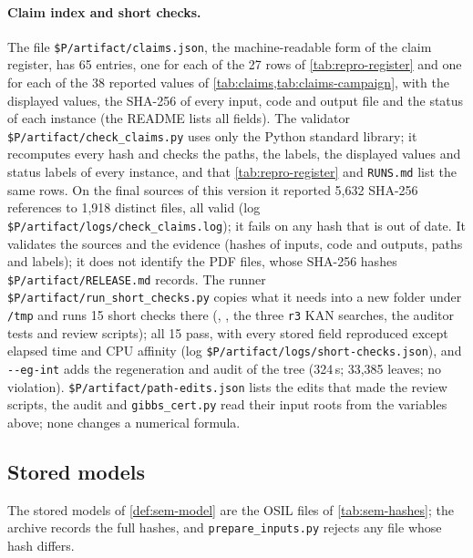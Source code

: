\paragraph{Claim index and short checks.}
The file \nolinkurl{$P/artifact/claims.json}, the machine-readable form of the claim register, has 65 entries, one for each of the 27 rows of \cref{tab:repro-register} and one for each of the 38 reported values of \cref{tab:claims,tab:claims-campaign}, with the displayed values, the SHA-256 of every input, code and output file and the status of each instance (the README lists all fields).
The validator \nolinkurl{$P/artifact/check_claims.py} uses only the Python standard library; it recomputes every hash and checks the paths, the labels, the displayed values and status labels of every instance, and that \cref{tab:repro-register} and \nolinkurl{RUNS.md} list the same rows.
On the final sources of this version it reported 5,632 SHA-256 references to 1,918 distinct files, all valid (log \nolinkurl{$P/artifact/logs/check_claims.log}); it fails on any hash that is out of date.
It validates the sources and the evidence (hashes of inputs, code and outputs, paths and labels); it does not identify the PDF files, whose SHA-256 hashes \nolinkurl{$P/artifact/RELEASE.md} records.
The runner \nolinkurl{$P/artifact/run_short_checks.py} copies what it needs into a new folder under \nolinkurl{/tmp} and runs 15 short checks there (, , the three \texttt{r3} KAN searches, the  auditor tests and review scripts); all 15 pass, with every stored field reproduced except elapsed time and CPU affinity (log \nolinkurl{$P/artifact/logs/short-checks.json}), and \nolinkurl{--eg-int} adds the regeneration and audit of the  tree (324\,s; 33,385 leaves; no violation).
\nolinkurl{$P/artifact/path-edits.json} lists the edits that made the review scripts, the audit and \nolinkurl{gibbs_cert.py} read their input roots from the variables above; none changes a numerical formula.

\subsection{Stored models}\label{app:repro-models}

The stored models of \cref{def:sem-model} are the OSIL files of \cref{tab:sem-hashes}; the archive records the full hashes, and \nolinkurl{prepare_inputs.py} rejects any file whose hash differs.




